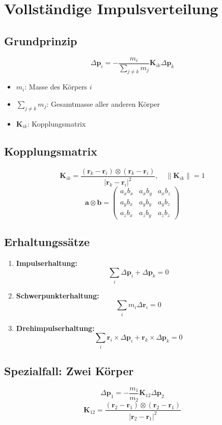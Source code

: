 \section{Vollständige Impulsverteilung}
\subsection{Grundprinzip}
\[
\Delta \mathbf{p}_i = -\frac{m_i}{\sum_{j \neq k} m_j} \mathbf{K}_{ik} \Delta \mathbf{p}_k
\]
\begin{itemize}
    \item \(m_i\): Masse des Körpers \(i\)
    \item \(\sum_{j \neq k} m_j\): Gesamtmasse aller anderen Körper
    \item \(\mathbf{K}_{ik}\): Kopplungsmatrix
\end{itemize}

\subsection{Kopplungsmatrix}
\[
\mathbf{K}_{ik} = \frac{(\mathbf{r}_k - \mathbf{r}_i) \otimes (\mathbf{r}_k - \mathbf{r}_i)}{|\mathbf{r}_k - \mathbf{r}_i|^2}, \quad \|\mathbf{K}_{ik}\| = 1
\]
\[
\mathbf{a} \otimes \mathbf{b} = \begin{pmatrix}
a_x b_x & a_x b_y & a_x b_z \\
a_y b_x & a_y b_y & a_y b_z \\
a_z b_x & a_z b_y & a_z b_z
\end{pmatrix}
\]

\subsection{Erhaltungssätze}
\begin{enumerate}
    \item \textbf{Impulserhaltung:}
    \[
    \sum_i \Delta\mathbf{p}_i + \Delta\mathbf{p}_k = 0
    \]
    \item \textbf{Schwerpunkterhaltung:}
    \[
    \sum_i m_i \Delta\mathbf{r}_i = 0
    \]
    \item \textbf{Drehimpulserhaltung:}
    \[
    \sum_i \mathbf{r}_i \times \Delta\mathbf{p}_i + \mathbf{r}_k \times \Delta\mathbf{p}_k = 0
    \]
\end{enumerate}

\subsection{Spezialfall: Zwei Körper}
\[
\Delta\mathbf{p}_1 = -\frac{m_1}{m_2} \mathbf{K}_{12} \Delta\mathbf{p}_2
\]
\[
\mathbf{K}_{12} = \frac{(\mathbf{r}_2 - \mathbf{r}_1) \otimes (\mathbf{r}_2 - \mathbf{r}_1)}{|\mathbf{r}_2 - \mathbf{r}_1|^2}
\]